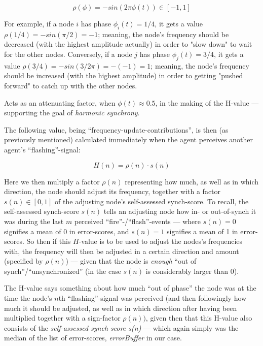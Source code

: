			\begin{equation}
			\label{amp_sign_freq_adj}
				\rho(\phi) = - sin(2\pi\phi(t)) \in [-1, 1]
			\end{equation}
			
			For example, if a node $i$ has phase $\phi_i(t)=1/4$, it gets a value $\rho(1/4) = - sin(\pi/2) = -1$; meaning, the node's frequency should be decreased (with the highest amplitude actually) in order to "slow down" to wait for the other nodes. Conversely, if a node $j$ has phase $\phi_j(t)=3/4$, it gets a value $\rho(3/4) = - sin(3/2 \pi) = -(-1) = 1$; meaning, the node's frequency should be increased (with the highest amplitude) in order to getting "pushed forward" to catch up with the other nodes.
			
			Acts as an attenuating factor, when $\phi(t)\approx0.5$, in the making of the H-value — supporting the goal of \textit{harmonic synchrony}.

			
			The following value, being ``frequency-update-contributions'', is then (as previously mentioned) calculated immediately when the agent perceives another agent's ``flashing''-signal:
			
			\begin{equation}
			\label{h_value}
				H(n) = \rho(n) \cdot s(n)
			\end{equation}
			
			Here we then multiply a factor $\rho(n)$ representing how much, as well as in which direction, the node should adjust its frequency, together with a factor $s(n) \in [0,1]$ of the adjusting node's self-assessed synch-score. To recall, the self-assessed synch-score $s(n)$ tells an adjusting node how in- or out-of-synch it was during the last $m$ perceived ``fire''-/``flash''-events — where $s(n)=0$ signifies a mean of 0 in error-scores, and $s(n)=1$ signifies a mean of 1 in error-scores. So then if this $H$-value is to be used to adjust the nodes's frequencies with, the frequency will then be adjusted in a certain direction and amount (specified by $\rho(n)$) — given that the node is \textit{enough} ``out of synch''/``unsynchronized'' (in the case $s(n)$ is considerably larger than 0).
			
			The H-value says something about how much ``out of phase'' the node was at the time the node's $n$th ``flashing''-signal was perceived (and then followingly how much it should be adjusted, as well as in which direction after having been multiplied together with a sign-factor $\rho(n))$, given then that this H-value also consists of the \textit{self-assessed synch score s(n)} — which again simply was the median of the list of error-scores, \textit{errorBuffer} in our case.
			
